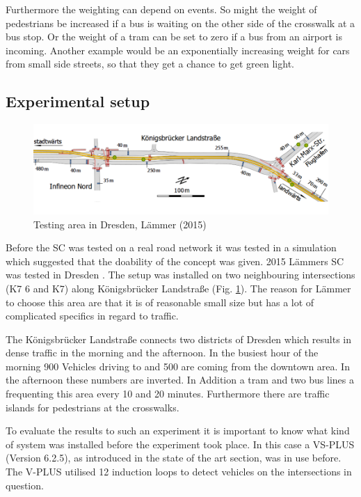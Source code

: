 Furthermore the weighting can depend on events. So might the weight of pedestrians be increased if a bus is waiting on the other side of the crosswalk at a bus stop. Or the weight of a tram can be set to zero if a bus from an airport is incoming. Another example would be an exponentially increasing weight for cars from small side streets, so that they get a chance to get green light.

\subsection{Experimental setup}

\begin{figure} [!htb]
	\centering
	\includegraphics[scale=0.26]{pic/testing_area.png}
	\caption{Testing area in Dresden, L\"ammer (2015) \cite{laemmer15}}
	\label{testing_area}
\end{figure}

Before the SC was tested on a real road network it was tested in a simulation \cite{simulation} which suggested that the doability of the concept was given. 2015 L\"ammers SC was tested in Dresden \cite{laemmer15}. The setup was installed on two neighbouring intersections (K7
6 and K7) along K\"onigsbr\"ucker Landstra{\ss}e (Fig. \ref{testing_area}). The reason for L\"ammer to choose this area are that it is of reasonable small size but has a lot of complicated specifics in regard to traffic. 

The  K\"onigsbr\"ucker Landstra{\ss}e connects two districts of Dresden which results in dense traffic in the morning and the afternoon. In the busiest hour of the morning 900 Vehicles driving to and 500 are coming from the downtown area. In the afternoon these numbers are inverted. In Addition a tram and two bus lines a frequenting this area every 10 and 20 minutes. Furthermore there are traffic islands for pedestrians at the crosswalks.  

To evaluate the results to such an experiment it is important to know what kind of system was installed before the experiment took place. In this case a VS-PLUS (Version 6.2.5), as introduced in the state of the art section, was in use before. The V-PLUS utilised 12 induction loops to detect vehicles on the intersections in question.

